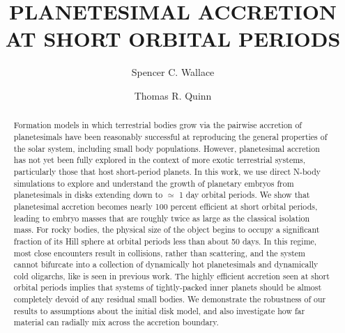 \documentclass[onecolumn]{aastex63}
\begin{document}
\title{PLANETESIMAL ACCRETION AT SHORT ORBITAL PERIODS}

\author{Spencer C. Wallace}

\author{Thomas R. Quinn}

\begin{abstract}
Formation models in which terrestrial bodies grow via the pairwise accretion of planetesimals have been reasonably successful at reproducing the general properties of the solar system, including small body populations. However, planetesimal accretion has not yet been fully explored in the context of more exotic terrestrial systems, particularly those that host short-period planets. In this work, we use direct N-body simulations to explore and understand the growth of planetary embryos from planetesimals in disks extending down to $\simeq$ 1 day orbital periods. We show that planetesimal accretion becomes nearly 100 percent efficient at short orbital periods, leading to embryo masses that are roughly twice as large as the classical isolation mass. For rocky bodies, the physical size of the object begins to occupy a significant fraction of its Hill sphere at orbital periods less than about 50 days. In this regime, most close encounters result in collisions, rather than scattering, and the system cannot bifurcate into a collection of dynamically hot planetesimals and dynamically cold oligarchs, like is seen in previous work. The highly efficient accretion seen at short orbital periods implies that systems of tightly-packed inner planets should be almost completely devoid of any residual small bodies. We demonstrate the robustness of our results to assumptions about the initial disk model, and also investigate how far material can radially mix across the accretion boundary.
\end{abstract}
\end{document}
